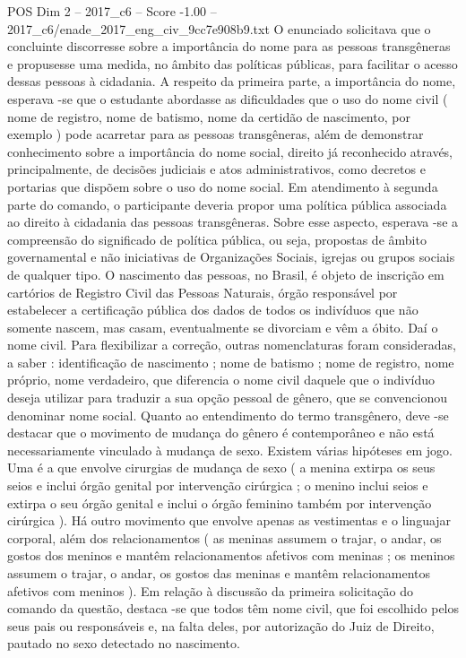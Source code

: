 \begin{textsample}{POS Dim 2 – 2017\_c6 – Score -1.00 – 2017\_c6/enade\_2017\_eng\_civ\_9cc7e908b9.txt}
O enunciado solicitava que o concluinte discorresse sobre a importância do nome para as pessoas transgêneras e propusesse uma medida, no âmbito das políticas públicas, para facilitar o acesso dessas pessoas à cidadania.
A respeito da primeira parte, a importância do nome, esperava -se que o estudante abordasse as dificuldades que o uso do nome civil ( nome de registro, nome de batismo, nome da certidão de nascimento, por exemplo ) pode acarretar para as pessoas transgêneras, além de demonstrar conhecimento sobre a importância do nome social, direito já reconhecido através, principalmente, de decisões judiciais e atos administrativos, como decretos e portarias que dispõem sobre o uso do nome social.
Em atendimento à segunda parte do comando, o participante deveria propor uma política pública associada ao direito à cidadania das pessoas transgêneras.
Sobre esse aspecto, esperava -se a compreensão do significado de política pública, ou seja, propostas de âmbito governamental e não iniciativas de Organizações Sociais, igrejas ou grupos sociais de qualquer tipo.
O nascimento das pessoas, no Brasil, é objeto de inscrição em cartórios de Registro Civil das Pessoas Naturais, órgão responsável por estabelecer a certificação pública dos dados de todos os indivíduos que não somente nascem, mas casam, eventualmente se divorciam e vêm a óbito.
Daí o nome civil.
Para flexibilizar a correção, outras nomenclaturas foram consideradas, a saber : identificação de nascimento ; nome de batismo ; nome de registro, nome próprio, nome verdadeiro, que diferencia o nome civil daquele que o indivíduo deseja utilizar para traduzir a sua opção pessoal de gênero, que se convencionou denominar nome social.
Quanto ao entendimento do termo transgênero, deve -se destacar que o movimento de mudança do gênero é contemporâneo e não está necessariamente vinculado à mudança de sexo.
Existem várias hipóteses em jogo.
Uma é a que envolve cirurgias de mudança de sexo ( a menina extirpa os seus seios e inclui órgão genital por intervenção cirúrgica ; o menino inclui seios e extirpa o seu órgão genital e inclui o órgão feminino também por intervenção cirúrgica ).
Há outro movimento que envolve apenas as vestimentas e o linguajar corporal, além dos relacionamentos ( as meninas assumem o trajar, o andar, os gostos dos meninos e mantêm relacionamentos afetivos com meninas ; os meninos assumem o trajar, o andar, os gostos das meninas e mantêm relacionamentos afetivos com meninos ).
Em relação à discussão da primeira solicitação do comando da questão, destaca -se que todos têm nome civil, que foi escolhido pelos seus pais ou responsáveis e, na falta deles, por autorização do Juiz de Direito, pautado no sexo detectado no nascimento.

\end{textsample}

